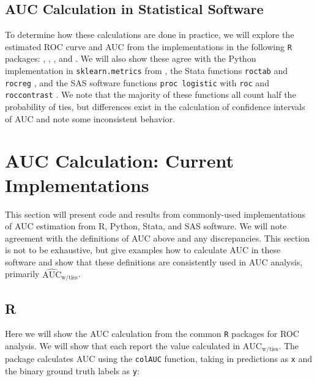 \documentclass[article]{jss}
\begin{document}
\hypertarget{auc-calculation-in-statistical-software}{%
\subsection{AUC Calculation in Statistical
Software}\label{auc-calculation-in-statistical-software}}

To determine how these calculations are done in practice, we will
explore the estimated ROC curve and AUC from the implementations in the
following \texttt{R} \citep{rcore} packages:  \citep{ROCR},
 \citep{caTools},  \citep{pROC}, and 
\citep{fbroc}. We will also show these agree with the Python
implementation in \texttt{sklearn.metrics} from 
\citep{scikitlearn}, the Stata functions \texttt{roctab} and
\texttt{rocreg} \citep{bamber1975area, delong}, and the SAS software
functions \texttt{proc\ logistic} with \texttt{roc} and
\texttt{roccontrast} . We note that the majority of these functions all
count half the probability of ties, but differences exist in the
calculation of confidence intervals of AUC and note some inconsistent
behavior.

\hypertarget{auc-calculation-current-implementations}{%
\section{AUC Calculation: Current
Implementations}\label{auc-calculation-current-implementations}}

This section will present code and results from commonly-used
implementations of AUC estimation from R, Python, Stata, and SAS
software. We will note agreement with the definitions of AUC above and
any discrepancies. This section is not to be exhaustive, but give
examples how to calculate AUC in these software and show that these
definitions are consistently used in AUC analysis, primarily
\(\widehat{\text{AUC}}_{\text{w/ties}}\).

\hypertarget{r}{%
\subsection{R}\label{r}}

Here we will show the AUC calculation from the common \texttt{R}
packages for ROC analysis. We will show that each report the value
calculated in \(\text{AUC}_{\text{w/ties}}\). The 
\citep{caTools} package calculates AUC using the \texttt{colAUC}
function, taking in predictions as \texttt{x} and the binary ground
truth labels as \texttt{y}:
\end{document}
